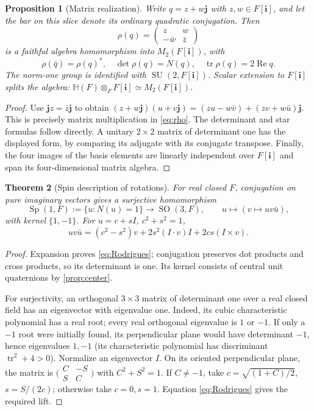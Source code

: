 \documentclass[11pt,letterpaper]{article}
\newtheorem{theorem}{Theorem}[section]
\newtheorem{proposition}[theorem]{Proposition}
\theoremstyle{definition}
\newcommand{\HH}{\mathbb H}
\newcommand{\ii}{\mathbf i}
\newcommand{\jj}{\mathbf j}
\DeclareMathOperator{\Rea}{Re}
\DeclareMathOperator{\Sp}{Sp}
\DeclareMathOperator{\SO}{SO}
\DeclareMathOperator{\SU}{SU}
\begin{document}
\begin{proposition}[Matrix realization]
\label{prop:matrix}
Write $q=z+w\jj$ with $z,w\in F[\ii]$, and let the bar on this slice denote its
ordinary quadratic conjugation. Then
\begin{equation}
 \rho(q)=\begin{pmatrix}z&w\\-\bar w&\bar z\end{pmatrix}
 \label{eq:rho}
\end{equation}
is a faithful algebra homomorphism into $M_2(F[\ii])$, with
\[
 \rho(\bar q)=\rho(q)^*,\quad \det\rho(q)=N(q),\quad
 \operatorname{tr}\rho(q)=2\Rea q.
\]
The norm-one group is identified with $\SU(2,F[\ii])$. Scalar extension to
$F[\ii]$ splits the algebra:
$\HH(F)\otimes_F F[\ii]\simeq M_2(F[\ii])$.
\end{proposition}
\begin{proof}
Use $\jj z=\bar z\jj$ to obtain
$(z+w\jj)(u+v\jj)=(zu-w\bar v)+(zv+w\bar u)\jj$.
This is precisely matrix multiplication in \eqref{eq:rho}. The determinant and
star formulas follow directly. A unitary $2\times2$ matrix of determinant one
has the displayed form, by comparing its adjugate with its conjugate transpose.
Finally, the four images of the basis elements are linearly independent over
$F[\ii]$ and span its four-dimensional matrix algebra.
\end{proof}

\begin{theorem}[Spin description of rotations]
\label{thm:spin}
For real closed $F$, conjugation on pure imaginary vectors gives a surjective
homomorphism
\[
 \Sp(1,F):=\{u:N(u)=1\}\longrightarrow\SO(3,F),\qquad
 u\longmapsto(v\mapsto uv\bar u),
\]
with kernel $\{1,-1\}$. For $u=c+sI$, $c^2+s^2=1$,
\begin{equation}
 uv\bar u=(c^2-s^2)v+2s^2(I\cdot v)I+2cs(I\times v).
 \label{eq:Rodrigues}
\end{equation}
\end{theorem}
\begin{proof}
Expansion proves \eqref{eq:Rodrigues}; conjugation preserves dot products and
cross products, so its determinant is one. Its kernel consists of central unit
quaternions by \cref{prop:center}.

For surjectivity, an orthogonal $3\times3$ matrix of determinant one over a real
closed field has an eigenvector with eigenvalue one. Indeed, its cubic
characteristic polynomial has a real root; every real orthogonal eigenvalue is
$1$ or $-1$. If only a $-1$ root were initially found, its perpendicular plane
would have determinant $-1$, hence eigenvalues $1,-1$ (its characteristic
polynomial has discriminant $\operatorname{tr}^2+4>0$).
Normalize an eigenvector $I$. On its oriented perpendicular plane, the matrix
is $\bigl(\begin{smallmatrix}C&-S\\S&C\end{smallmatrix}\bigr)$ with
$C^2+S^2=1$. If $C\ne-1$, take
$c=\sqrt{(1+C)/2}$, $s=S/(2c)$; otherwise take $c=0,s=1$.
Equation \eqref{eq:Rodrigues} gives the required lift.
\end{proof}
\end{document}
